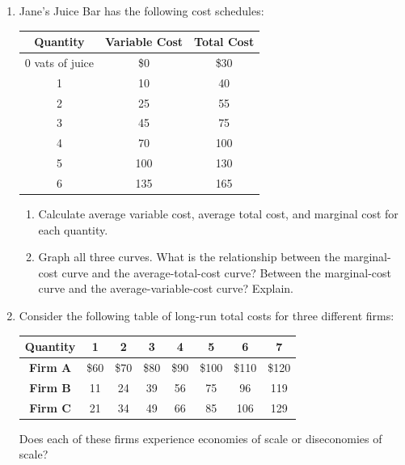 \documentclass{article}
\begin{document}
\begin{enumerate}
\item Jane's Juice Bar has the following cost schedules:

	\begin{center}
	\begin{tabular}{c | c | c}
	\textbf{Quantity} & \textbf{Variable Cost} & \textbf{Total Cost} \\
	\hline
	0 vats of juice & \$0 & \$30 \\
	1 & 10 & 40 \\
	2 & 25 & 55 \\
	3 & 45 & 75 \\
	4 & 70 & 100 \\
	5 & 100 & 130 \\
	6 & 135 & 165
	\end{tabular}
	\end{center}
	
	\begin{enumerate}
	
	\item Calculate average variable cost, average total cost, and marginal cost for each quantity.
	
	\item Graph all three curves. What is the relationship between the marginal-cost curve and the average-total-cost curve? Between the marginal-cost curve and the average-variable-cost curve? Explain.
	
	\end{enumerate}
	
\item Consider the following table of long-run total costs for three different firms:

	\begin{center}
	\begin{tabular}{| c | c | c | c | c | c | c | c |}
	\hline
	\textbf{Quantity} & 1 & 2 & 3 & 4 & 5 & 6 & 7 \\
	\hline
	\textbf{Firm A} & \$60 & \$70 & \$80 & \$90 & \$100 & \$110 & \$120 \\
	\hline
	\textbf{Firm B} & 11 & 24 & 39 & 56 & 75 & 96 & 119 \\
	\hline
	\textbf{Firm C} & 21 & 34 & 49 & 66 & 85 & 106 & 129 \\
	\hline
	\end{tabular}
	\end{center}
	
	Does each of these firms experience economies of scale or diseconomies of scale?

\end{enumerate}
\end{document}
